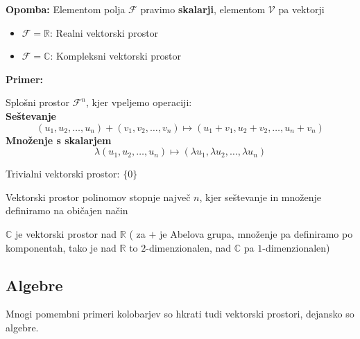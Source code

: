 \documentclass[a4paper]{article}
\newcounter{environment:definition_counter}
\newcounter{environment:theorem_counter}
\newcounter{environment:statement_counter}
\newcounter{example:example_counter}
\newenvironment{example}
{\textbf{Primer:}\\}
{\setcounter{example:example_counter}{0}}
\newenvironment{example_case}
{\refstepcounter{example:example_counter} \arabic{example:example_counter}.}
{\\}
\newenvironment{remark}
{\textbf{Opomba:}}
{}
\begin{document}
\begin{remark}
Elementom polja $\mathcal{F}$ pravimo \textbf{skalarji}, elementom $\mathcal{V}$ pa vektorji
\end{remark}

\begin{itemize}
\item $\mathcal{F} = \mathbb{R}$: Realni vektorski prostor
\item $\mathcal{F} = \mathbb{C}$: Kompleksni vektorski prostor

\end{itemize}

\begin{example}
\begin{example_case}
Splošni prostor $\mathcal{F}^n$, kjer vpeljemo operaciji:\\
\textbf{Seštevanje}
\begin{equation}
\label{eq:vector_space_addition}
(u_1, u_2, \dots , u_n) + (v_1, v_2, \dots, v_n) \mapsto (u_1 + v_1, u_2 + v_2, \dots, u_n + v_n)
\end{equation}
\textbf{Množenje s skalarjem}
\begin{equation}
\label{eq:vector_space_scalar_multiplication}
\lambda (u_1, u_2, \dots , u_n) \mapsto (\lambda u_1 , \lambda u_2 , \dots, \lambda u_n)
\end{equation}
\end{example_case}
\begin{example_case}
Trivialni vektorski prostor: $\{0\}$
\end{example_case}
\begin{example_case}
Vektorski prostor polinomov stopnje največ $n$, kjer seštevanje in množenje definiramo na običajen način
\end{example_case}
\begin{example_case}
$\mathbb{C}$ je vektorski prostor nad $\mathbb{R}$ ( za $+$ je Abelova grupa, množenje pa definiramo po komponentah, tako je nad $\mathbb{R}$ to $2$-dimenzionalen, nad $\mathbb{C}$ pa $1$-dimenzionalen)
\end{example_case}
\end{example}

\subsection{Algebre}
Mnogi pomembni primeri kolobarjev so hkrati tudi vektorski prostori, dejansko so algebre.
\end{document}
